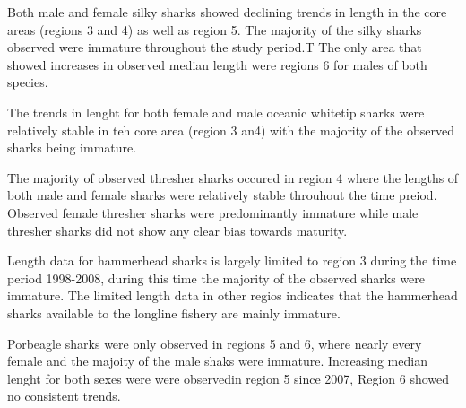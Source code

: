 \documentclass[12pt]{SCreport}
\begin{document}
Both male and female silky sharks showed declining trends in length in the core areas (regions 3 and 4) as well as region 5.  The majority of the silky sharks observed were immature throughout the study period.T The only area  that showed increases in observed median length were regions 6 for males of both species. 

The trends in lenght for both female and male oceanic whitetip sharks were relatively stable in teh core area (region 3 an4) with the majority of the observed sharks being immature.  

The majority of observed thresher sharks occured in region 4 where the lengths of both male and female sharks were relatively stable throuhout the time preiod. Observed female thresher sharks were predominantly immature while male thresher sharks did not show any clear bias towards maturity.

Length data for hammerhead sharks is largely limited to region 3 during the time period 1998-2008, during this time the majority of the observed sharks were immature. The limited length data in other regios indicates that the hammerhead sharks available to the longline fishery are mainly immature.

Porbeagle sharks were only observed in regions 5 and 6, where nearly every female and the majoity of the male shaks were immature.  Increasing median lenght for both sexes were were observedin region 5 since 2007, Region 6 showed no consistent trends.





      

\end{document}
